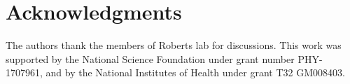 \section*{Acknowledgments}
The authors thank the members of Roberts lab for discussions. This work was supported by the National Science Foundation under grant number PHY-1707961, and by the National Institutes of Health under grant T32 GM008403.

\begin{appendices}

%

\renewcommand{\thesection}{A\arabic{section}}





%

\end{appendices}

%
%

\newpage
\normalsize



%


%
